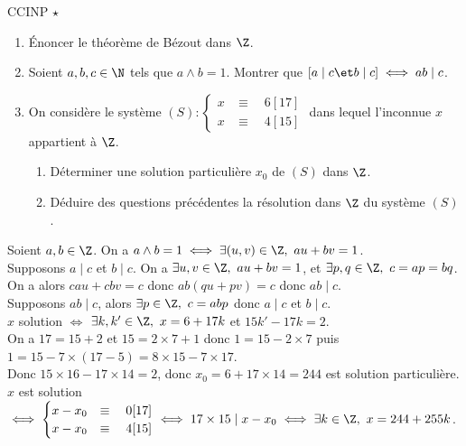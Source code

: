 \documentclass[11pt]{article}
\begin{document}

\begin{exercice}{CCINP $\star$}{}
    \begin{enumerate}
        \item Énoncer le théorème de Bézout dans $\Z$.
        \item Soient $a,b,c\in \N$ tels que $a\land b = 1$. Montrer que $[a \mid c \et b \mid c] \iff ab \mid c$.
        \item On considère le système $(S):\begin{cases} x &\equiv \quad 6[17] \\ x &\equiv \quad 4[15]\end{cases}$ dans lequel l'inconnue $x$ appartient à $\Z$.
        \begin{enumerate}
            \item Déterminer une solution particulière $x_0$ de $(S)$ dans $\Z$.
            \item Déduire des questions précédentes la résolution dans $\Z$ du système $(S)$.
        \end{enumerate}
    \end{enumerate}
    \tcblower
     Soient $a,b\in \Z$. On a $a\land b = 1 \iff \exists (u,v)\in\Z, ~ au+bv=1$.\\
     Supposons $a\mid c$ et $b\mid c$. On a $\exists u,v \in \Z, ~ au+bv=1$, et $\exists p,q \in \Z, ~ c=ap=bq$.\\
    On a alors $cau+cbv=c$ donc $ab(qu+pv)=c$ donc $ab\mid c$.\\
     Supposons $ab\mid c$, alors $\exists p \in \Z, ~ c = abp$ donc $a\mid c$ et $b\mid c$.\\
     $x$ solution $\iff$ $\exists k,k' \in \Z, ~ x = 6 + 17k$ et $15k'-17k=2$.\\
    On a $17=15+2$ et $15=2\times7+1$ donc $1=15-2\times7$ puis $1=15-7\times (17 - 5)=8\times15-7\times17$.\\
    Donc $15\times16 - 17\times 14 = 2$, donc $x_0=6+17\times14=244$ est solution particulière.\\
     $x$ est solution $\iff \begin{cases}x-x_0 &\equiv \quad 0[17]\\ x-x_0 &\equiv \quad 4[15]\end{cases} \iff 17\times15 \mid x-x_0\iff \exists k \in \Z, ~ x = 244 + 255k$.
\end{exercice}
\end{document}

